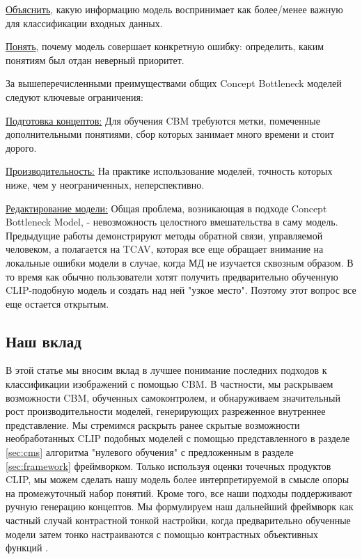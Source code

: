 \begin{description}
\item \underline{Объяснить}, какую информацию модель воспринимает как более/менее важную для классификации входных данных.
\item \underline{Понять}, почему модель совершает конкретную ошибку: определить, каким понятиям был отдан неверный приоритет.
\end{description}

За вышеперечисленными преимуществами общих Concept Bottleneck моделей следуют ключевые ограничения:
\begin{description}
\item \underline{Подготовка концептов:} Для обучения CBM требуются метки, помеченные дополнительными понятиями, сбор которых занимает много времени и стоит дорого.
\item \underline{Производительность:} На практике использование моделей, точность которых ниже, чем у неограниченных, неперспективно.
\item \underline{Редактирование модели:} Общая проблема, возникающая в подходе Concept Bottleneck Model, - невозможность целостного вмешательства в саму модель. Предыдущие работы \cite{yuksekgonul2023posthoc} демонстрируют методы обратной связи, управляемой человеком, а \cite{oikarinen2023labelfree} полагается на TCAV\cite{kim2018interpretability}, которая все еще обращает внимание на локальные ошибки модели в случае, когда МД не изучается сквозным образом. В то время как обычно пользователи хотят получить предварительно обученную CLIP-подобную модель и создать над ней "узкое место". Поэтому этот вопрос все еще остается открытым.
\end{description}

\subsection{Наш вклад}

В этой статье мы вносим вклад в лучшее понимание последних подходов к классификации изображений с помощью CBM. В частности, мы раскрываем возможности CBM, обученных самоконтролем, и обнаруживаем значительный рост производительности моделей, генерирующих разреженное внутреннее представление. Мы стремимся раскрыть ранее скрытые возможности необработанных CLIP подобных моделей с помощью представленного в разделе \ref{sec:cms} алгоритма "нулевого обучения" с предложенным в разделе \ref{sec:framework} фреймворком. Только используя оценки точечных продуктов CLIP, мы можем сделать нашу модель более интерпретируемой в смысле опоры на промежуточный набор понятий. Кроме того, все наши подходы поддерживают ручную генерацию концептов. Мы формулируем наш дальнейший фреймворк как частный случай контрастной тонкой настройки, когда предварительно обученные модели затем тонко настраиваются с помощью контрастных объективных функций \cite{weng2021contrastive}.  

